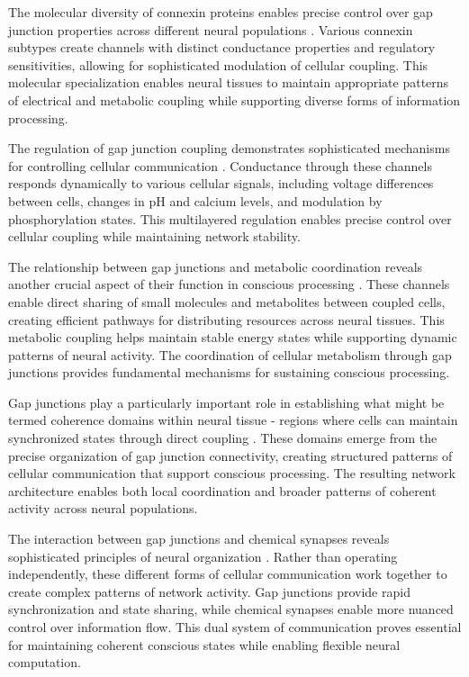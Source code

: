 \begin{refsection}
The molecular diversity of connexin proteins enables precise control over gap junction properties across different neural populations \cite{Willecke2002}. Various connexin subtypes create channels with distinct conductance properties and regulatory sensitivities, allowing for sophisticated modulation of cellular coupling. This molecular specialization enables neural tissues to maintain appropriate patterns of electrical and metabolic coupling while supporting diverse forms of information processing.

The regulation of gap junction coupling demonstrates sophisticated mechanisms for controlling cellular communication \cite{Nagy2018}. Conductance through these channels responds dynamically to various cellular signals, including voltage differences between cells, changes in pH and calcium levels, and modulation by phosphorylation states. This multilayered regulation enables precise control over cellular coupling while maintaining network stability.

The relationship between gap junctions and metabolic coordination reveals another crucial aspect of their function in conscious processing \cite{Hormuzdi2004}. These channels enable direct sharing of small molecules and metabolites between coupled cells, creating efficient pathways for distributing resources across neural tissues. This metabolic coupling helps maintain stable energy states while supporting dynamic patterns of neural activity. The coordination of cellular metabolism through gap junctions provides fundamental mechanisms for sustaining conscious processing.

Gap junctions play a particularly important role in establishing what might be termed coherence domains within neural tissue - regions where cells can maintain synchronized states through direct coupling \cite{Pannasch2013}. These domains emerge from the precise organization of gap junction connectivity, creating structured patterns of cellular communication that support conscious processing. The resulting network architecture enables both local coordination and broader patterns of coherent activity across neural populations.

The interaction between gap junctions and chemical synapses reveals sophisticated principles of neural organization \cite{Pereda2014}. Rather than operating independently, these different forms of cellular communication work together to create complex patterns of network activity. Gap junctions provide rapid synchronization and state sharing, while chemical synapses enable more nuanced control over information flow. This dual system of communication proves essential for maintaining coherent conscious states while enabling flexible neural computation.


\end{refsection}
